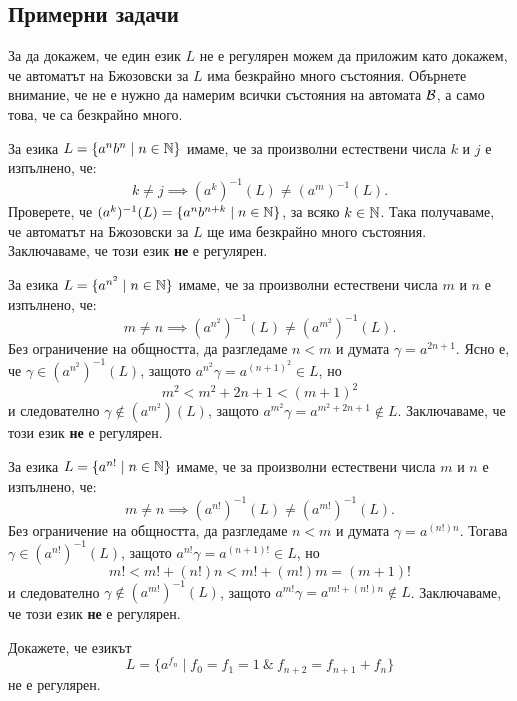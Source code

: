 \subsection{Примерни задачи}

За да докажем, че един език $L$ не е регулярен можем да приложим 
като докажем, че автоматът на Бжозовски за $L$ има безкрайно много състояния.
Обърнете внимание, че не е нужно да намерим всички състояния на автомата $\mathcal{B}$, а само това, че са безкрайно много.

\begin{example}
  За езика $L = \{a^nb^n\mid n \in \mathbb{N}\}$ имаме, че за произволни естествени числа $k$ и $j$ е изпълнено, че:
  \[k \neq j \implies (a^k)^{-1}(L) \neq (a^m)^{-1}(L).\]
  Проверете, че $(a^k)^{-1}(L) = \{a^{n}b^{n+k} \mid n\in\mathbb{N}\}$, за всяко $k \in \mathbb{N}$.
  Така получаваме, че автоматът на Бжозовски за $L$ ще има безкрайно много състояния.
  Заключаваме, че този език {\bf не} е регулярен.
\end{example}

\begin{example}
  За езика $L = \{a^{n^2} \mid n \in \mathbb{N}\}$ имаме, че за произволни естествени числа $m$ и $n$ е изпълнено, че:
  \[m \neq n \implies (a^{n^2})^{-1}(L) \neq (a^{m^2})^{-1}(L).\]
  Без ограничение на общността, да разгледаме $n < m$ и думата $\gamma = a^{2n+1}$.
  Ясно е, че $\gamma \in (a^{n^2})^{-1}(L)$, защото $a^{n^2}\gamma = a^{(n+1)^2} \in L$, но 
  \[m^2 < m^2 + 2n + 1 < (m+1)^2\]
  и следователно $\gamma \not\in (a^{m^2})(L)$, защото $a^{m^2}\gamma = a^{m^2+2n+1}\not\in L$.
  Заключаваме, че този език {\bf не} е регулярен.
\end{example}

\begin{example}
  За езика $L = \{a^{n!} \mid n \in \mathbb{N}\}$ имаме, че за произволни естествени числа $m$ и $n$ е изпълнено, че:
  \[m \neq n \implies (a^{n!})^{-1}(L) \neq (a^{m!})^{-1}(L).\]
  Без ограничение на общността, да разгледаме $n < m$ и думата $\gamma = a^{(n!)n}$.
  Тогава $\gamma \in (a^{n!})^{-1}(L)$, защото $a^{n!}\gamma = a^{(n+1)!} \in L$, но 
  \[m! < m! + (n!)n < m! + (m!)m = (m+1)!\]
  и следователно $\gamma \not\in (a^{m!})^{-1}(L)$,
  защото $a^{m!}\gamma = a^{m!+(n!)n}\not\in L$.
  Заключаваме, че този език {\bf не} е регулярен.
\end{example}

\begin{problem}
  Докажете, че езикът 
  \[L = \{a^{f_n} \mid f_0 = f_1 = 1\ \&\ f_{n+2} = f_{n+1} + f_{n}\}\]
  не е регулярен.
\end{problem}


